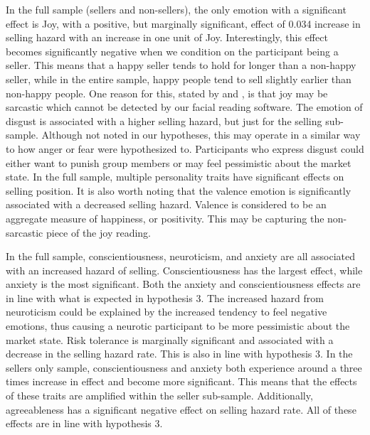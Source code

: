 \documentclass[11pt]{article}
\begin{document}
In the full sample (sellers and non-sellers), the only emotion with a significant effect is Joy, with a positive, but marginally significant, effect of 0.034 increase in selling hazard with an increase in one unit of Joy. Interestingly, this effect becomes significantly negative when we condition on the participant being a seller. This means that a happy seller tends to hold for longer than a non-happy seller, while in the entire sample, happy people tend to sell slightly earlier than non-happy people. One reason for this, stated by \cite{forman2020capturing} and \cite{hoque2012exploring}, is that joy may be sarcastic which cannot be detected by our facial reading software. The emotion of disgust is associated with a higher selling hazard, but just for the selling sub-sample. Although not noted in our hypotheses, this may operate in a similar way to how anger or fear were hypothesized to. Participants who express disgust could either want to punish group members or may feel pessimistic about the market state.
In the full sample, multiple personality traits have significant effects on selling position. It is also worth noting that the valence emotion is significantly associated with a decreased selling hazard. Valence is considered to be an aggregate measure of happiness, or positivity. This may be capturing the non-sarcastic piece of the joy reading. 

In the full sample, conscientiousness, neuroticism, and anxiety are all associated with an increased hazard of selling. Conscientiousness has the largest effect, while anxiety is the most significant. Both the anxiety and conscientiousness effects are in line with what is expected in hypothesis 3. The increased hazard from neuroticism could be explained by the increased tendency to feel negative emotions, thus causing a neurotic participant to be more pessimistic about the market state. Risk tolerance is marginally significant and associated with a decrease in the selling hazard rate. This is also in line with hypothesis 3. 
In the sellers only sample, conscientiousness and anxiety both experience around a three times increase in effect and become more significant. This means that the effects of these traits are amplified within the seller sub-sample. Additionally, agreeableness has a significant negative effect on selling hazard rate. All of these effects are in line with hypothesis 3. 


%
\end{document}
